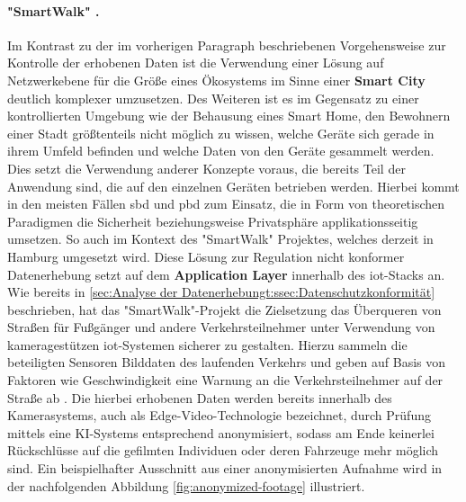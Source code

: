 \paragraph{"SmartWalk" \cite{Natix2022}.} %
\label{sec:Hauptteil:ssec:Regulationsmöglichkeiten:para:SmartWalk}
Im Kontrast zu der im vorherigen Paragraph  beschriebenen Vorgehensweise zur Kontrolle der erhobenen Daten ist die Verwendung einer Lösung auf Netzwerkebene für die Größe eines Ökosystems im Sinne einer \textbf{Smart City} deutlich komplexer umzusetzen. Des Weiteren ist es im Gegensatz zu einer kontrollierten Umgebung wie der Behausung eines Smart Home, den Bewohnern einer Stadt größtenteils nicht möglich zu wissen, welche Geräte sich gerade in ihrem Umfeld befinden und welche Daten von den Geräte gesammelt werden. Dies setzt die Verwendung anderer Konzepte voraus, die bereits Teil der Anwendung sind, die auf den einzelnen Geräten betrieben werden. Hierbei kommt in den meisten Fällen \ac{sbd} und \ac{pbd} zum Einsatz, die in Form von theoretischen Paradigmen die Sicherheit beziehungsweise Privatsphäre applikationsseitig umsetzen. So auch im Kontext des "SmartWalk" \cite{Natix2022} Projektes, welches derzeit in Hamburg umgesetzt wird. Diese Lösung zur Regulation nicht konformer Datenerhebung setzt auf dem \textbf{Application Layer} innerhalb des \ac{iot}-Stacks an.
Wie bereits in \ref{sec:Analyse der Datenerhebungt:ssec:Datenschutzkonformität} beschrieben, hat das "SmartWalk"-Projekt die Zielsetzung das Überqueren von Straßen für Fußgänger und andere Verkehrsteilnehmer unter Verwendung von kameragestützen \ac{iot}-Systemen sicherer zu gestalten. Hierzu sammeln die beteiligten Sensoren Bilddaten des laufenden Verkehrs und geben auf Basis von Faktoren wie Geschwindigkeit eine Warnung an die Verkehrsteilnehmer auf der Straße ab \cite{SmartWalk2022}. Die hierbei erhobenen Daten werden bereits innerhalb des Kamerasystems, auch als Edge-Video-Technologie bezeichnet, durch Prüfung mittels eine KI-Systems entsprechend anonymisiert, sodass am Ende keinerlei Rückschlüsse auf die gefilmten Individuen oder deren Fahrzeuge mehr möglich sind. Ein beispielhafter Ausschnitt aus einer anonymisierten Aufnahme wird in der nachfolgenden Abbildung \ref{fig:anonymized-footage} illustriert.

